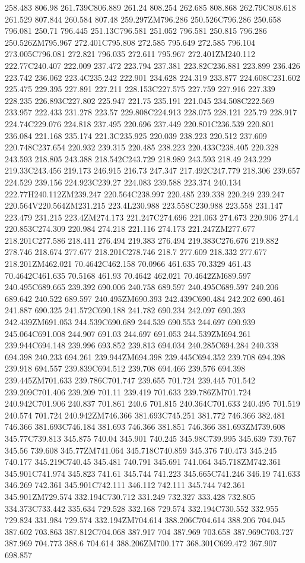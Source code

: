 258.483 806.98 261.739C806.889 261.24 808.254 262.685 808.868 262.79C808.618 261.529 807.844 260.584 807.48 259.297ZM796.286 250.526C796.286 250.658 796.081 250.71 796.445 251.13C796.581 251.052 796.581 250.815 796.286 250.526ZM795.967 272.401C795.808 272.585 795.649 272.585 796.104 273.005C796.081 272.821 796.035 272.611 795.967 272.401ZM240.112 222.77C240.407 222.009 237.472 223.794 237.381 223.82C236.881 223.899 236.426 223.742 236.062 223.4C235.242 222.901 234.628 224.319 233.877 224.608C231.602 225.475 229.395 227.891 227.211 228.153C227.575 227.759 227.916 227.339 228.235 226.893C227.802 225.947 221.75 235.191 221.045 234.508C222.569 233.957 222.433 231.278 223.57 229.808C224.913 228.075 228.121 225.79 228.917 224.74C229.076 224.818 237.495 220.696 237.449 220.801C236.539 220.801 236.084 221.168 235.174 221.3C235.925 220.039 238.223 220.512 237.609 220.748C237.654 220.932 239.315 220.485 238.223 220.433C238.405 220.328 243.593 218.805 243.388 218.542C243.729 218.989 243.593 218.49 243.229 219.33C243.456 219.173 246.915 216.73 247.347 217.492C247.779 218.306 239.657 224.529 239.156 224.923C239.27 224.083 239.588 223.374 240.134 222.77H240.112ZM239.247 220.564C238.997 220.485 239.338 220.249 239.247 220.564V220.564ZM231.215 223.4L230.988 223.558C230.988 223.558 231.147 223.479 231.215 223.4ZM274.173 221.247C274.696 221.063 274.673 220.906 274.4 220.853C274.309 220.984 274.218 221.116 274.173 221.247ZM277.677 218.201C277.586 218.411 276.494 219.383 276.494 219.383C276.676 219.882 278.746 218.674 277.677 218.201C278.746 218.7 277.609 218.332 277.677 218.201ZM462.021 70.4642C462.158 70.0966 461.635 70.3329 461.43 70.4642C461.635 70.5168 461.93 70.4642 462.021 70.4642ZM689.597 240.495C689.665 239.392 690.006 240.758 689.597 240.495C689.597 240.206 689.642 240.522 689.597 240.495ZM690.393 242.439C690.484 242.202 690.461 241.887 690.325 241.572C690.188 241.782 690.234 242.097 690.393 242.439ZM691.053 244.539C690.689 244.539 690.553 244.697 690.939 245.064C691.008 244.907 691.03 244.697 691.053 244.539ZM694.261 239.944C694.148 239.996 693.852 239.813 694.034 240.285C694.284 240.338 694.398 240.233 694.261 239.944ZM694.398 239.445C694.352 239.708 694.398 239.918 694.557 239.839C694.512 239.708 694.466 239.576 694.398 239.445ZM701.633 239.786C701.747 239.655 701.724 239.445 701.542 239.209C701.406 239.209 701.11 239.419 701.633 239.786ZM701.724 240.942C701.906 240.837 701.861 240.6 701.815 240.364C701.633 240.495 701.519 240.574 701.724 240.942ZM746.366 381.693C745.251 381.772 746.366 382.481 746.366 381.693C746.184 381.693 746.366 381.851 746.366 381.693ZM739.608 345.77C739.813 345.875 740.04 345.901 740.245 345.98C739.995 345.639 739.767 345.56 739.608 345.77ZM741.064 345.718C740.859 345.376 740.473 345.245 740.177 345.219C740.45 345.481 740.791 345.691 741.064 345.718ZM742.361 345.901C741.974 345.823 741.61 345.744 741.223 345.665C741.246 346.19 741.633 346.269 742.361 345.901C742.111 346.112 742.111 345.744 742.361 345.901ZM729.574 332.194C730.712 331.249 732.327 333.428 732.805 334.373C733.442 335.634 729.528 332.168 729.574 332.194C730.552 332.955 729.824 331.984 729.574 332.194ZM704.614 388.206C704.614 388.206 704.045 387.602 703.863 387.812C704.068 387.917 704 387.969 703.658 387.969C703.727 387.969 704.773 388.6 704.614 388.206ZM700.177 368.301C699.472 367.907 698.857 